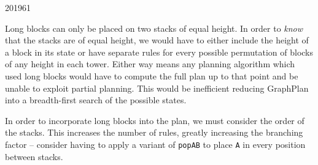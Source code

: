 \documentclass[10pt,\jkfside,a4paper]{article}
\begin{document}
\begin{examquestion}{2019}{6}{1}
\begin{enumerate}[label=(\alph*)]
Long blocks can only be placed on two stacks of equal height. In order to
\textit{know} that the stacks are of equal height, we would have to either
include the height of a block in its state or have separate rules for every
possible permutation of blocks of any height in each tower. Either way
means any planning algorithm which used long blocks would have to compute
the full plan up to that point and be unable to exploit partial planning.
This would be inefficient reducing GraphPlan into a breadth-first search of
the possible states.

In order to incorporate long blocks into the plan, we must consider the
order of the stacks. This increases the number of rules, greatly increasing
the branching factor -- consider having to apply a variant of \texttt{popAB}
to place \texttt{A} in every position between stacks.

\end{enumerate}

\end{examquestion}
\end{document}
